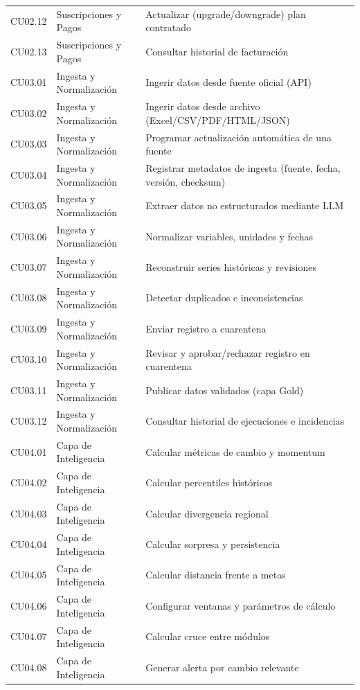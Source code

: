 \documentclass[11pt,a4paper]{article}
\begin{document}
\begin{longtable}{@{}>{\raggedright\arraybackslash}p{2.2cm} >{\raggedright\arraybackslash}p{4.3cm} >{\raggedright\arraybackslash}p{\dimexpr\textwidth-2.2cm-4.3cm-6\tabcolsep\relax}@{}}
CU02.12 & Suscripciones y Pagos & Actualizar (upgrade/downgrade) plan contratado \\
CU02.13 & Suscripciones y Pagos & Consultar historial de facturaci\'on \\
\midrule
CU03.01 & Ingesta y Normalizaci\'on & Ingerir datos desde fuente oficial (API) \\
CU03.02 & Ingesta y Normalizaci\'on & Ingerir datos desde archivo (Excel/CSV/PDF/HTML/JSON) \\
CU03.03 & Ingesta y Normalizaci\'on & Programar actualizaci\'on autom\'atica de una fuente \\
CU03.04 & Ingesta y Normalizaci\'on & Registrar metadatos de ingesta (fuente, fecha, versi\'on, checksum) \\
CU03.05 & Ingesta y Normalizaci\'on & Extraer datos no estructurados mediante LLM \\
CU03.06 & Ingesta y Normalizaci\'on & Normalizar variables, unidades y fechas \\
CU03.07 & Ingesta y Normalizaci\'on & Reconstruir series hist\'oricas y revisiones \\
CU03.08 & Ingesta y Normalizaci\'on & Detectar duplicados e inconsistencias \\
CU03.09 & Ingesta y Normalizaci\'on & Enviar registro a cuarentena \\
CU03.10 & Ingesta y Normalizaci\'on & Revisar y aprobar/rechazar registro en cuarentena \\
CU03.11 & Ingesta y Normalizaci\'on & Publicar datos validados (capa Gold) \\
CU03.12 & Ingesta y Normalizaci\'on & Consultar historial de ejecuciones e incidencias \\
\midrule
CU04.01 & Capa de Inteligencia & Calcular m\'etricas de cambio y momentum \\
CU04.02 & Capa de Inteligencia & Calcular percentiles hist\'oricos \\
CU04.03 & Capa de Inteligencia & Calcular divergencia regional \\
CU04.04 & Capa de Inteligencia & Calcular sorpresa y persistencia \\
CU04.05 & Capa de Inteligencia & Calcular distancia frente a metas \\
CU04.06 & Capa de Inteligencia & Configurar ventanas y par\'ametros de c\'alculo \\
CU04.07 & Capa de Inteligencia & Calcular cruce entre m\'odulos \\
CU04.08 & Capa de Inteligencia & Generar alerta por cambio relevante \\

\end{longtable}
\end{document}
